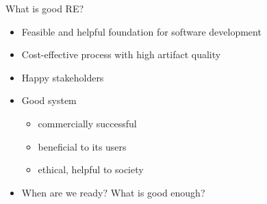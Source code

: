 
\begin{Slide}{What is good RE?}

\begin{itemize}
\item Feasible and helpful foundation for software development
\item Cost-effective process with high artifact quality
\item Happy stakeholders
\item Good system 
\begin{itemize}
\item commercially successful
\item beneficial to its users
\item ethical, helpful to society
\end{itemize}
\item When are we ready? What is good enough?

\end{itemize}
\end{Slide}